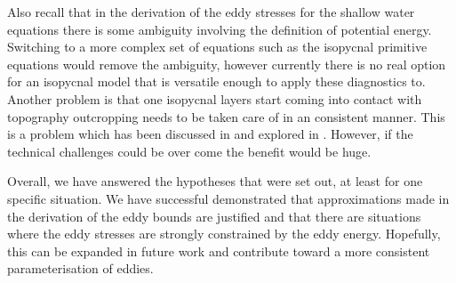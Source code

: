 \documentclass[12pt,a4paper]{report}
\begin{document}
  Also recall that in the derivation of the eddy stresses for the shallow water
  equations there is some ambiguity involving the definition of potential energy. 
  Switching to a more complex set of equations such as the isopycnal primitive equations
  would remove the ambiguity, however currently there is no real option for
  an isopycnal model that is versatile enough to apply these diagnostics to. Another
  problem is that one isopycnal layers start coming into contact with topography 
  outcropping needs to be taken care of in an consistent manner. This is a problem
  which has been discussed in \cite{dell2010abyssal} and explored in \cite{diehl2012working}. However, if the technical challenges could be over come
  the benefit would be huge.
  
  Overall, we have answered the hypotheses that were set out, at least for one specific
  situation. We have successful demonstrated that approximations made in the
  derivation of the eddy bounds are justified and that there are situations where
  the eddy stresses are strongly constrained by the eddy energy. Hopefully, this
  can be expanded in future work and contribute toward a more consistent parameterisation
  of eddies.

	 \printbibliography
\end{document}
